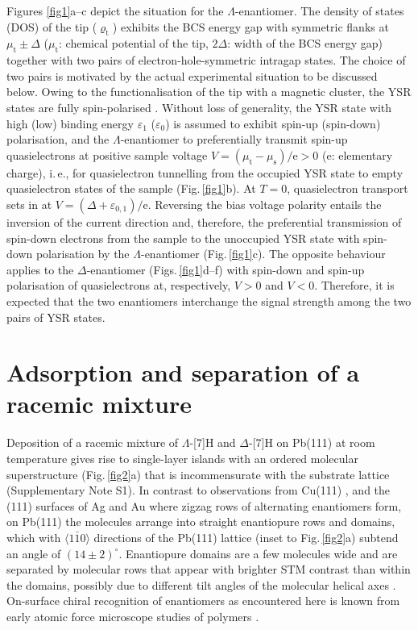 \documentclass[aps,floatfix,12pt]{revtex4-2}
\begin{document}
Figures \ref{fig1}a--c depict the situation for the $\Lambda$-enantiomer.
The density of states (DOS) of the tip ($\varrho_\text{t}$) exhibits the BCS energy gap with symmetric flanks at $\mu_\text{t}\pm\Delta$ ($\mu_\text{t}$: chemical potential of the tip, $2\Delta$: width of the BCS energy gap) together with two pairs of electron-hole-symmetric intragap states.
The choice of two pairs is motivated by the actual experimental situation to be discussed below.
Owing to the functionalisation of the tip with a magnetic cluster, the YSR states are fully spin-polarised \cite{sciadv_7_eabd7302,nanoscale_14_15111,natcommun_15_459}.
Without loss of generality, the YSR state with high (low) binding energy $\varepsilon_1$ ($\varepsilon_0$) is assumed to exhibit spin-up (spin-down) polarisation, and the $\Lambda$-enantiomer to preferentially transmit spin-up quasielectrons at positive sample voltage $V=(\mu_\text{t}-\mu_\text{s})/\text{e}>0$ (e: elementary charge), i.\,e., for quasielectron tunnelling from the occupied YSR state to empty quasielectron states of the sample (Fig.\,\ref{fig1}b)\@.
At $T=0$, quasielectron transport sets in at $V=(\Delta+\varepsilon_{0,1})/\text{e}$.
Reversing the bias voltage polarity entails the inversion of the current direction and, therefore, the preferential transmission of spin-down electrons from the sample to the unoccupied YSR state with spin-down polarisation by the $\Lambda$-enantiomer (Fig.\,\ref{fig1}c)\@.
The opposite behaviour applies to the $\Delta$-enantiomer (Figs.\,\ref{fig1}d--f) with spin-down and spin-up polarisation of quasielectrons at, respectively, $V>0$ and $V<0$\@.
Therefore, it is expected that the two enantiomers interchange the signal strength among the two pairs of YSR states.

\section*{Adsorption and separation of a racemic mixture}

Deposition of a racemic mixture of $\Lambda$-[7]H and $\Delta$-[7]H on Pb(111) at room temperature gives rise to single-layer islands with an ordered molecular superstructure (Fig.\,\ref{fig2}a) that is incommensurate with the substrate lattice (Supplementary Note S1)\@.
In contrast to observations from Cu(111) \cite{cgd_8_1890}, and the (111) surfaces of Ag and Au \cite{jpcc_118_29135,chir_32_975} where zigzag rows of alternating enantiomers form, on Pb(111) the molecules arrange into straight enantiopure rows and domains, which with $\langle 1\bar{1}0\rangle$ directions of the Pb(111) lattice (inset to Fig.\,\ref{fig2}a) subtend an angle of $(14\pm 2)^\circ$\@.
Enantiopure domains are a few molecules wide and are separated by molecular rows that appear with brighter STM contrast than within the domains, possibly due to different tilt angles of the molecular helical axes \cite{ape_18_015502}.
On-surface chiral recognition of enantiomers as encountered here is known from early atomic force microscope studies of polymers \cite{nature_368_440}.
\end{document}
